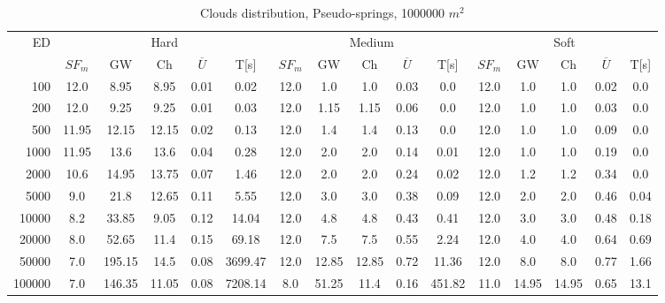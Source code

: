 \begin{table}[htb]
	\centering
	\footnotesize
	\begin{tabular}{|r|c|c|c|c|c|c|c|c|c|c|c|c|c|c|c|} 
		\hline
		\multirow{2}{*}{ED} & \multicolumn{5}{c|}{Hard} & \multicolumn{5}{c|}{Medium} &\multicolumn{5}{c|}{Soft} \\ 
		\cline{2-16} 
		&$SF_{m}$&GW & Ch & $\overline{U}$&T[s] &$SF_{m}$&GW & Ch & $\overline{U}$ &T[s] &$SF_{m}$&GW & Ch & $\overline{U}$  & T[s]  \\ 
		\hline 
		100 & 12.0 & 8.95 & 8.95 & 0.01 & 0.02 & 12.0 & 1.0 & 1.0 & 0.03 & 0.0 & 12.0 & 1.0 & 1.0 & 0.02 & 0.0\\ 
		200 & 12.0 & 9.25 & 9.25 & 0.01 & 0.03 & 12.0 & 1.15 & 1.15 & 0.06 & 0.0 & 12.0 & 1.0 & 1.0 & 0.03 & 0.0\\ 
		500 & 11.95 & 12.15 & 12.15 & 0.02 & 0.13 & 12.0 & 1.4 & 1.4 & 0.13 & 0.0 & 12.0 & 1.0 & 1.0 & 0.09 & 0.0\\ 
		1000 & 11.95 & 13.6 & 13.6 & 0.04 & 0.28 & 12.0 & 2.0 & 2.0 & 0.14 & 0.01 & 12.0 & 1.0 & 1.0 & 0.19 & 0.0\\ 
		2000 & 10.6 & 14.95 & 13.75 & 0.07 & 1.46 & 12.0 & 2.0 & 2.0 & 0.24 & 0.02 & 12.0 & 1.2 & 1.2 & 0.34 & 0.0\\ 
		5000 & 9.0 & 21.8 & 12.65 & 0.11 & 5.55 & 12.0 & 3.0 & 3.0 & 0.38 & 0.09 & 12.0 & 2.0 & 2.0 & 0.46 & 0.04\\ 
		10000 & 8.2 & 33.85 & 9.05 & 0.12 & 14.04 & 12.0 & 4.8 & 4.8 & 0.43 & 0.41 & 12.0 & 3.0 & 3.0 & 0.48 & 0.18\\ 
		20000 & 8.0 & 52.65 & 11.4 & 0.15 & 69.18 & 12.0 & 7.5 & 7.5 & 0.55 & 2.24 & 12.0 & 4.0 & 4.0 & 0.64 & 0.69\\ 
		50000 & 7.0 & 195.15 & 14.5 & 0.08 & 3699.47 & 12.0 & 12.85 & 12.85 & 0.72 & 11.36 & 12.0 & 8.0 & 8.0 & 0.77 & 1.66\\ 
		100000 & 7.0 & 146.35 & 11.05 & 0.08 & 7208.14 & 8.0 & 51.25 & 11.4 & 0.16 & 451.82 & 11.0 & 14.95 & 14.95 & 0.65 & 13.1\\ 
		\hline 
	\end{tabular} 
	\caption{Clouds distribution, Pseudo-springs, 1000000 $m^2$} 
	\label{tab:UnSprings1000} 
\end{table} 
